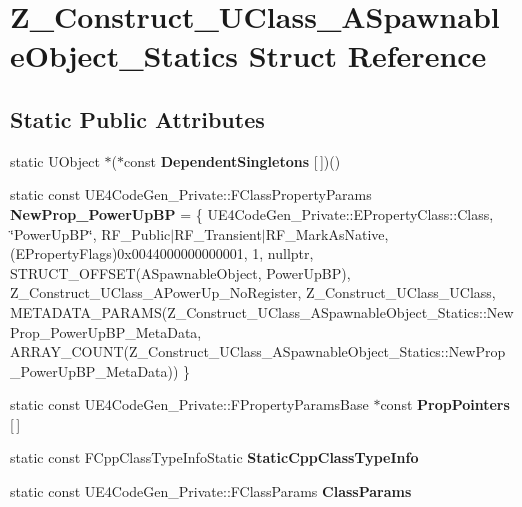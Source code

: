 \hypertarget{struct_z___construct___u_class___a_spawnable_object___statics}{}\section{Z\+\_\+\+Construct\+\_\+\+U\+Class\+\_\+\+A\+Spawnable\+Object\+\_\+\+Statics Struct Reference}
\label{struct_z___construct___u_class___a_spawnable_object___statics}
\subsection*{Static Public Attributes}
\begin{DoxyCompactItemize}
\item 
\mbox{\label{struct_z___construct___u_class___a_spawnable_object___statics_a49580f7b98fdaae8a774c4726b856066}} 
static U\+Object $\ast$($\ast$const {\bfseries Dependent\+Singletons} \mbox{[}$\,$\mbox{]})()
\item 
\mbox{\label{struct_z___construct___u_class___a_spawnable_object___statics_a1a1c714144711935da5d312104c28604}} 
static const U\+E4\+Code\+Gen\+\_\+\+Private\+::\+F\+Class\+Property\+Params {\bfseries New\+Prop\+\_\+\+Power\+Up\+BP} = \{ U\+E4\+Code\+Gen\+\_\+\+Private\+::\+E\+Property\+Class\+::\+Class, \char`\"{}Power\+Up\+BP\char`\"{}, R\+F\+\_\+\+Public$\vert$R\+F\+\_\+\+Transient$\vert$R\+F\+\_\+\+Mark\+As\+Native, (E\+Property\+Flags)0x0044000000000001, 1, nullptr, S\+T\+R\+U\+C\+T\+\_\+\+O\+F\+F\+S\+E\+T(\+A\+Spawnable\+Object, Power\+Up\+B\+P), Z\+\_\+\+Construct\+\_\+\+U\+Class\+\_\+\+A\+Power\+Up\+\_\+\+No\+Register, Z\+\_\+\+Construct\+\_\+\+U\+Class\+\_\+\+U\+Class, M\+E\+T\+A\+D\+A\+T\+A\+\_\+\+P\+A\+R\+A\+M\+S(\+Z\+\_\+\+Construct\+\_\+\+U\+Class\+\_\+\+A\+Spawnable\+Object\+\_\+\+Statics\+::\+New\+Prop\+\_\+\+Power\+Up\+B\+P\+\_\+\+Meta\+Data, A\+R\+R\+A\+Y\+\_\+\+C\+O\+U\+N\+T(\+Z\+\_\+\+Construct\+\_\+\+U\+Class\+\_\+\+A\+Spawnable\+Object\+\_\+\+Statics\+::\+New\+Prop\+\_\+\+Power\+Up\+B\+P\+\_\+\+Meta\+Data)) \}
\item 
static const U\+E4\+Code\+Gen\+\_\+\+Private\+::\+F\+Property\+Params\+Base $\ast$const {\bfseries Prop\+Pointers} \mbox{[}$\,$\mbox{]}
\item 
static const F\+Cpp\+Class\+Type\+Info\+Static {\bfseries Static\+Cpp\+Class\+Type\+Info}
\item 
static const U\+E4\+Code\+Gen\+\_\+\+Private\+::\+F\+Class\+Params {\bfseries Class\+Params}
\end{DoxyCompactItemize}


